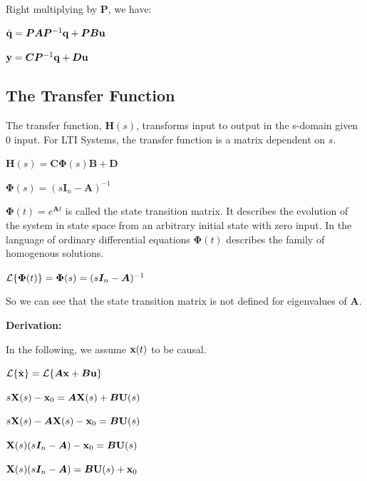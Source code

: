 \documentclass[11pt]{article}
\begin{document}
  Right multiplying by \(\bm{P}\), we have:

  \(\dot{\mathbf{q}} = \bm{P}\bm{A}\bm{P}^{-1}\mathbf{q} + \bm{P}\bm{B}\mathbf{u}\)

  \(\mathbf{y} = \bm{C}\bm{P}^{-1}\mathbf{q} + \bm{D}\mathbf{u}\)

  \pagebreak

  \subsection{The Transfer Function}

  The transfer function, \(\bm{H}(s)\), transforms input to output in the s-domain given 0 input.
  For LTI Systems, the transfer function is a matrix dependent on \(s\).

  \(\bm{H}(s) = \bm{C}\bm{\Phi}(s)\bm{B} + \bm{D}\)

  \(\bm{\Phi}(s) = (s\bm{I}_n - \bm{A})^{-1}\)

  \vspace{12pt}

  \(\bm{\Phi}(t) = e^{\bm{A}t}\) is called the state transition matrix. It describes the evolution of the system
  in state space from an arbitrary initial state with zero input. In the language of ordinary
  differential equations \(\bm{\Phi}(t)\) describes the family of homogenous solutions.

  \(\mathcal{L}{\left\{ \bm{\Phi}(t) \right\}} = \bm{\Phi}(s) = (s\bm{I}_n - \bm{A})^{-1}\)

  \vspace{12pt}

  So we can see that the state transition matrix is not defined for eigenvalues of \(\bm{A}\).

  \vspace{12pt}

  \textbf{Derivation:}

  In the following, we assume \(\mathbf{x}(t)\) to be causal.

  \vspace{12pt}

  \(\mathcal{L}{\left\{ \dot{\mathbf{x}} \right\}} = \mathcal{L}{\left\{ \bm{A}\mathbf{x} + \bm{B}\mathbf{u} \right\}}\)

  \(s\mathbf{X}(s) - \mathbf{x}_0 = \bm{A}\mathbf{X}(s) + \bm{B}\mathbf{U}(s)\)

  \(s\mathbf{X}(s) -\bm{A}\mathbf{X}(s) - \mathbf{x}_0 = \bm{B}\mathbf{U}(s)\)

  \(\mathbf{X}(s)(s\bm{I}_n - \bm{A}) - \mathbf{x}_0 = \bm{B}\mathbf{U}(s)\)

  \(\mathbf{X}(s)(s\bm{I}_n - \bm{A}) = \bm{B}\mathbf{U}(s) + \mathbf{x}_0\)
\end{document}
